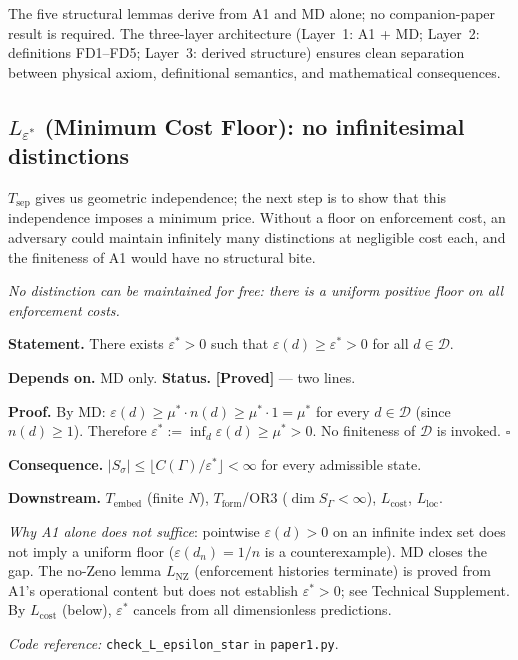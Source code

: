 \documentclass[11pt]{article}
\theoremstyle{remark}
\newcommand{\coderef}[2]{\smallskip\noindent\textit{Code reference:} \texttt{#1} in \texttt{#2}.}
\begin{document}
The five structural lemmas derive from A1 and MD alone; no companion-paper result is required.  The three-layer architecture (Layer~1: A1 + MD; Layer~2: definitions FD1--FD5; Layer~3: derived structure) ensures clean separation between physical axiom, definitional semantics, and mathematical consequences.

\subsection{\texorpdfstring{$L_{\varepsilon^*}$}{L epsilon*} (Minimum Cost Floor): no infinitesimal distinctions}
\label{sec:eps_star}

\noindent $T_{\mathrm{sep}}$ gives us geometric independence; the next step is to show that this independence imposes a minimum price.  Without a floor on enforcement cost, an adversary could maintain infinitely many distinctions at negligible cost each, and the finiteness of A1 would have no structural bite.

\begin{tcolorbox}[apfbox, title={$L_{\varepsilon^*}$ (Minimum Cost Floor) --- Theorem}]
\label{sec:logical_status_eps_star}
\textit{No distinction can be maintained for free: there is a uniform positive floor on all enforcement costs.}

\smallskip\noindent\textbf{Statement.}  There exists $\varepsilon^* > 0$ such that $\varepsilon(d) \ge \varepsilon^* > 0$ for all $d \in \mathcal{D}$.

\smallskip\noindent\textbf{Depends on.}  MD only.  \textbf{Status.}  \textbf{[Proved]} --- two lines.

\smallskip\noindent\textbf{Proof.}  By MD: $\varepsilon(d) \ge \mu^* \cdot n(d) \ge \mu^* \cdot 1 = \mu^*$ for every $d \in \mathcal{D}$ (since $n(d) \ge 1$).  Therefore $\varepsilon^* := \inf_d \varepsilon(d) \ge \mu^* > 0$.  No finiteness of $\mathcal{D}$ is invoked.  \hfill$\square$

\smallskip\noindent\textbf{Consequence.}  $|S_\sigma| \le \lfloor C(\Gamma)/\varepsilon^* \rfloor < \infty$ for every admissible state.

\smallskip\noindent\textbf{Downstream.}  $T_{\mathrm{embed}}$ (finite $N$), $T_{\mathrm{form}}$/OR3 ($\dim S_\Gamma < \infty$), $L_{\mathrm{cost}}$, $L_{\mathrm{loc}}$.

\smallskip\noindent\textit{Why A1 alone does not suffice}: pointwise $\varepsilon(d) > 0$ on an infinite index set does not imply a uniform floor ($\varepsilon(d_n) = 1/n$ is a counterexample).  MD closes the gap.  The no-Zeno lemma $L_{\mathrm{NZ}}$ (enforcement histories terminate) is proved from A1's operational content but does not establish $\varepsilon^* > 0$; see Technical Supplement.  By $L_{\mathrm{cost}}$ (below), $\varepsilon^*$ cancels from all dimensionless predictions.

\coderef{check\_L\_epsilon\_star}{paper1.py}
\end{tcolorbox}
\end{document}
